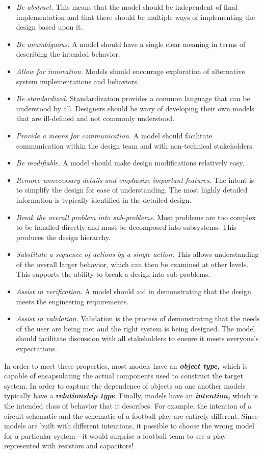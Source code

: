 \begin{itemize}
\item
  \emph{Be abstract.} This means that the model should be independent of
  final implementation and that there should be multiple ways of
  implementing the design based upon it.
\item
  \emph{Be unambiguous.} A model should have a single clear meaning in
  terms of describing the intended behavior.
\item
  \emph{Allow for innovation.} Models should encourage exploration of
  alternative system implementations and behaviors.
\item
  \emph{Be standardized.} Standardization provides a common language
  that can be understood by all. Designers should be wary of developing
  their own models that are ill-defined and not commonly understood.
\item
  \emph{Provide a means for communication.} A model should facilitate
  communication within the design team and with non-technical
  stakeholders.
\item
  \emph{Be modifiable.} A model should make design modifications
  relatively easy.
\item
  \emph{Remove unnecessary details and emphasize important features.}
  The intent is to simplify the design for ease of understanding. The
  most highly detailed information is typically identified in the
  detailed design.
\item
  \emph{Break the overall problem into sub-problems.} Most problems are
  too complex to be handled directly and must be decomposed into
  subsystems. This produces the design hierarchy.
\item
  \emph{Substitute a sequence of actions by a single action.} This
  allows understanding of the overall larger behavior, which can then be
  examined at other levels. This supports the ability to break a design
  into sub-problems.
\item
  \emph{Assist in verification.} A model should aid in demonstrating
  that the design meets the engineering requirements.
\item
  \emph{Assist in validation.} Validation is the process of
  demonstrating that the needs of the user are being met and the right
  system is being designed. The model should facilitate discussion with
  all stakeholders to ensure it meets everyone's expectations.
\end{itemize}

In order to meet these properties, most models have an
\emph{\textbf{object type,}} which is capable of encapsulating the
actual components used to construct the target system. In order to
capture the dependence of objects on one another models typically have a
\emph{\textbf{relationship type}}. Finally, models have an
\emph{\textbf{intention,}} which is the intended class of behavior that
it describes. For example, the intention of a circuit schematic and the
schematic of a football play are entirely different. Since models are
built with different intentions, it possible to choose the wrong model
for a particular system---it would surprise a football team to see a
play represented with resistors and capacitors!

